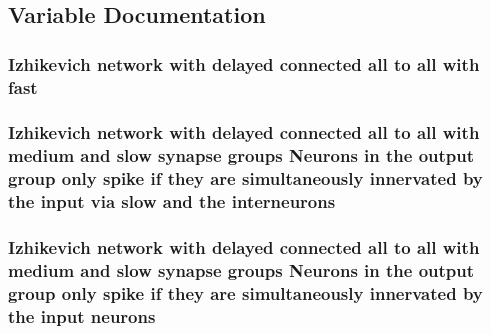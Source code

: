 \subsection{Variable Documentation}
\hypertarget{userproject_2SynDelay__project_2README_8txt_a840f37532f55f9578b62c562cf737636}{
\subsubsection[{fast}]{\setlength{\rightskip}{0pt plus 5cm}Izhikevich {\bf network} {\bf with} delayed connected all {\bf to} all {\bf with} fast}}\label{userproject_2SynDelay__project_2README_8txt_a840f37532f55f9578b62c562cf737636}
\hypertarget{userproject_2SynDelay__project_2README_8txt_adf6327d22e2c11a62a22ab5afd4f2b81}{
\subsubsection[{interneurons}]{\setlength{\rightskip}{0pt plus 5cm}Izhikevich {\bf network} {\bf with} delayed connected all {\bf to} all {\bf with} medium and slow synapse {\bf groups} Neurons {\bf in} the output group only spike if they are simultaneously innervated by the input via slow and the interneurons}}\label{userproject_2SynDelay__project_2README_8txt_adf6327d22e2c11a62a22ab5afd4f2b81}
\hypertarget{userproject_2SynDelay__project_2README_8txt_a70f8ce34c10b15b6e0f669ff7bb2f696}{
\subsubsection[{neurons}]{\setlength{\rightskip}{0pt plus 5cm}Izhikevich {\bf network} {\bf with} delayed connected all {\bf to} all {\bf with} medium and slow synapse {\bf groups} Neurons {\bf in} the output group only spike if they are simultaneously innervated by the input neurons}}\label{userproject_2SynDelay__project_2README_8txt_a70f8ce34c10b15b6e0f669ff7bb2f696}
